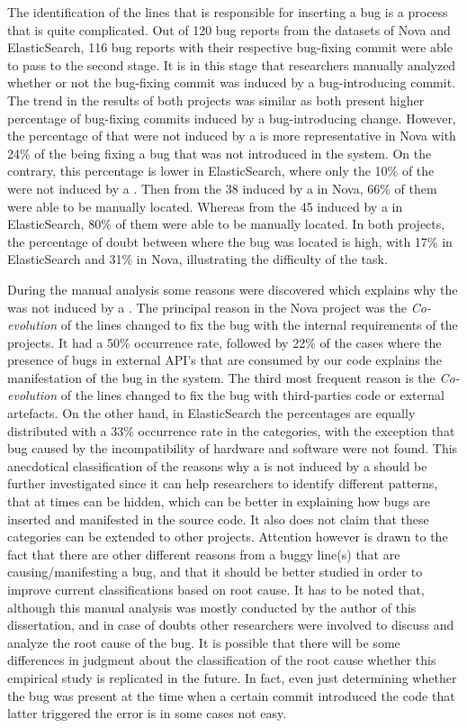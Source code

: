 \documentclass[a4paper, 12pt]{book}
\begin{document}
The identification of the lines that is responsible for inserting a bug is a process that is quite complicated. Out of 120 bug reports from the datasets of Nova and ElasticSearch, 116 bug reports with their respective  bug-fixing commit were able to pass to the second stage. It is in this stage that researchers manually analyzed whether or not the bug-fixing commit was induced by a bug-introducing commit. The trend in the results of both projects was similar as both present higher percentage of bug-fixing commits induced by a bug-introducing change. However, the percentage of \BFC that were not induced by a \BIC is more representative in Nova with 24\% of the \BFC being fixing a bug that was not introduced in the system. On the contrary, this percentage is lower in ElasticSearch, where only the 10\% of the \BFC were not induced by a \BIC. Then from the 38 \BFC induced by a \BIC in Nova, 66\% of them were able to be manually located. Whereas from the 45 \BFC induced by a \BIC in ElasticSearch,  80\% of them were able to be manually located. In both projects, the percentage of doubt between where the bug was located is high, with 17\% in ElasticSearch and  31\% in Nova, illustrating the difficulty of the task. 

During the manual analysis some reasons were discovered which explains why the \BFC was not induced by a \BIC. The principal reason in the Nova project was the \emph{Co-evolution} of the lines changed to fix the bug with the internal requirements of the projects. It had a 50\% occurrence rate, followed by 22\% of the cases where the presence of bugs in external API's that are consumed by our code explains the manifestation of the bug in the system. The third most frequent reason is the \emph{Co-evolution} of the lines changed to fix the bug with third-parties code or external artefacts. On the other hand, in ElasticSearch the percentages are equally distributed with a 33\% occurrence rate in the categories, with the exception that bug caused by the incompatibility of hardware and software were not found. This anecdotical classification of the reasons why a \BFC is not induced by a \BIC should be further investigated since it can help researchers to identify different patterns, that at times can be hidden, which can be better in explaining how bugs are inserted and manifested in the source code. It also does not claim that these categories can be extended to other projects. Attention however is drawn to the fact that there are other different reasons from a buggy line(s) that are causing/manifesting a bug, and that it should be better studied in order to improve current classifications based on root cause. It has to be noted that, although this manual analysis was mostly conducted by the author of this dissertation, and in case of doubts other researchers were involved to discuss and analyze the root cause of the bug. It is possible that there will be some differences in judgment about the classification of the root cause whether this empirical study is replicated in the future. In fact, even just determining whether the bug was present at the time when a certain commit introduced the code that latter triggered the error is in some cases not easy.  
\end{document}
